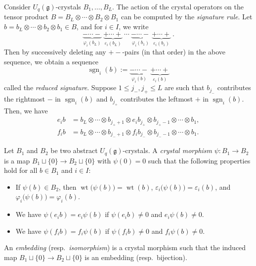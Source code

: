 \documentclass[reqno]{amsart}
\newcommand{\g}{\mathfrak{g}}
\newcommand{\sgn}{\!\operatorname{sgn}}
\DeclareMathOperator{\wt}{wt} %
\newcommand{\defn}[1]{{\color{darkred}\emph{#1}}} %
\theoremstyle{plain}
\theoremstyle{definition}
\numberwithin{equation}{section}
\begin{document}
Consider $U_q(\g)$-crystals $B_1, \dotsc, B_L$.
The action of the crystal operators on the tensor product $B = B_L \otimes \cdots \otimes B_2 \otimes B_1$ can be computed by the \defn{signature rule}.
Let $b = b_L \otimes \cdots \otimes b_2 \otimes b_1 \in B$, and for $i \in I$, we write
\[
\underbrace{-\cdots-}_{\varphi_i(b_L)}\
\underbrace{+\cdots+}_{\varepsilon_i(b_L)}\
\cdots\
\underbrace{-\cdots-}_{\varphi_i(b_1)}\
\underbrace{+\cdots+}_{\varepsilon_i(b_1)}\ .
\]
Then by successively deleting any $+-$-pairs (in that order) in the above sequence, we obtain a sequence
\[
\sgn_i(b) :=
\underbrace{-\cdots-}_{\varphi_i(b)}\
\underbrace{+\cdots+}_{\varepsilon_i(b)}
\]
called the \defn{reduced signature}.
Suppose $1 \leq j_-, j_+ \leq L$ are such that $b_{j_-}$ contributes the rightmost $-$ in $\sgn_i(b)$ and $b_{j_+}$ contributes the leftmost $+$ in $\sgn_i(b)$. 
Then, we have
\begin{align*}
e_i b &= b_L \otimes \cdots \otimes b_{j_++1} \otimes e_ib_{j_+} \otimes b_{j_+-1} \otimes \cdots \otimes b_1, \\
f_i b &= b_L \otimes \cdots \otimes b_{j_-+1} \otimes f_ib_{j_-} \otimes b_{j_--1} \otimes \cdots \otimes b_1.
\end{align*}

Let $B_1$ and $B_2$ be two abstract $U_q(\g)$-crystals.
A \defn{crystal morphism} $\psi \colon B_1 \to B_2$ is a map $B_1 \sqcup \{0\} \to B_2 \sqcup \{0\}$ with $\psi(0) = 0$ such that the following properties hold for all $b \in B_1$ and $i \in I$:
\begin{itemize}
\item[(1)] If $\psi(b) \in B_2$, then $\wt\bigl(\psi(b)\bigr) = \wt(b)$, $\varepsilon_i\bigl(\psi(b)\bigr) = \varepsilon_i(b)$, and $\varphi_i\bigl(\psi(b)\bigr) = \varphi_i(b)$.
\item[(2)] We have $\psi(e_i b) = e_i \psi(b)$ if $\psi(e_i b) \neq 0$ and $e_i \psi(b) \neq 0$.
\item[(3)] We have $\psi(f_i b) = f_i \psi(b)$ if $\psi(f_i b) \neq 0$ and $f_i \psi(b) \neq 0$.
\end{itemize}
An \defn{embedding} (resp.~\defn{isomorphism}) is a crystal morphism such that the induced map $B_1 \sqcup \{0\} \to B_2 \sqcup \{0\}$ is an embedding (resp.~bijection).
\end{document}
